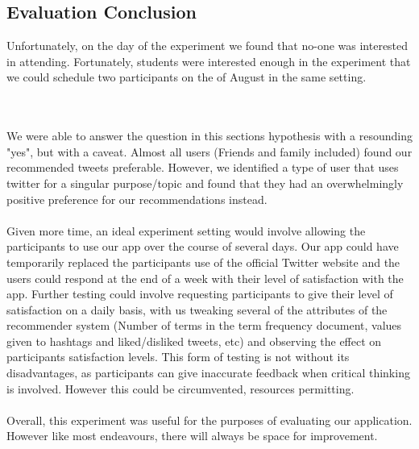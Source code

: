 \documentclass{article}
\begin{document}
\subsection{Evaluation Conclusion} 







Unfortunately, on the day of the experiment we found that no-one was interested in attending. Fortunately, students were interested enough in the experiment that we could schedule two participants on the  of August in the same setting. 


\\\\
We were able to answer the question in this sections hypothesis with a resounding "yes", but with a caveat. Almost all users (Friends and family included) found our recommended tweets preferable. However, we identified a type of user that uses twitter for a singular purpose/topic and found that they had an overwhelmingly positive preference for our recommendations instead.
\\\\



Given more time, an ideal experiment setting would involve allowing the participants to use our app over the course of several days. Our app could have temporarily replaced the participants use of the official Twitter website and the users could respond at the end of a week with their level of satisfaction with the app. Further testing could involve requesting participants to give their level of satisfaction on a daily basis, with us tweaking several of the attributes of the recommender system (Number of terms in the term frequency document, values given to hashtags and liked/disliked tweets, etc) and observing the effect on participants satisfaction levels. This form of testing is not without its disadvantages, as participants can give inaccurate feedback when critical thinking is involved. However this could be circumvented, resources permitting.
\\\\
Overall, this experiment was useful for the purposes of evaluating our application. However like most endeavours, there will always be space for improvement. 
\end{document}

